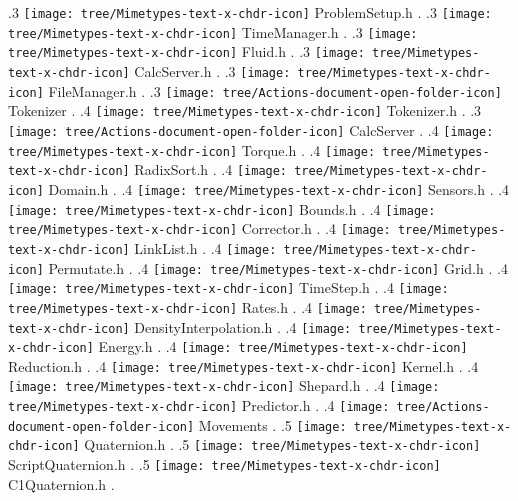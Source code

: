 {.3 { \texttt{[image: tree/Mimetypes-text-x-chdr-icon]} ProblemSetup.h }.
.3 { \texttt{[image: tree/Mimetypes-text-x-chdr-icon]} TimeManager.h }.
.3 { \texttt{[image: tree/Mimetypes-text-x-chdr-icon]} Fluid.h }.
.3 { \texttt{[image: tree/Mimetypes-text-x-chdr-icon]} CalcServer.h }.
.3 { \texttt{[image: tree/Mimetypes-text-x-chdr-icon]} FileManager.h }.
.3 { \texttt{[image: tree/Actions-document-open-folder-icon]} Tokenizer }.
.4 { \texttt{[image: tree/Mimetypes-text-x-chdr-icon]} Tokenizer.h }.
.3 { \texttt{[image: tree/Actions-document-open-folder-icon]} CalcServer }.
.4 { \texttt{[image: tree/Mimetypes-text-x-chdr-icon]} Torque.h }.
.4 { \texttt{[image: tree/Mimetypes-text-x-chdr-icon]} RadixSort.h }.
.4 { \texttt{[image: tree/Mimetypes-text-x-chdr-icon]} Domain.h }.
.4 { \texttt{[image: tree/Mimetypes-text-x-chdr-icon]} Sensors.h }.
.4 { \texttt{[image: tree/Mimetypes-text-x-chdr-icon]} Bounds.h }.
.4 { \texttt{[image: tree/Mimetypes-text-x-chdr-icon]} Corrector.h }.
.4 { \texttt{[image: tree/Mimetypes-text-x-chdr-icon]} LinkList.h }.
.4 { \texttt{[image: tree/Mimetypes-text-x-chdr-icon]} Permutate.h }.
.4 { \texttt{[image: tree/Mimetypes-text-x-chdr-icon]} Grid.h }.
.4 { \texttt{[image: tree/Mimetypes-text-x-chdr-icon]} TimeStep.h }.
.4 { \texttt{[image: tree/Mimetypes-text-x-chdr-icon]} Rates.h }.
.4 { \texttt{[image: tree/Mimetypes-text-x-chdr-icon]} DensityInterpolation.h }.
.4 { \texttt{[image: tree/Mimetypes-text-x-chdr-icon]} Energy.h }.
.4 { \texttt{[image: tree/Mimetypes-text-x-chdr-icon]} Reduction.h }.
.4 { \texttt{[image: tree/Mimetypes-text-x-chdr-icon]} Kernel.h }.
.4 { \texttt{[image: tree/Mimetypes-text-x-chdr-icon]} Shepard.h }.
.4 { \texttt{[image: tree/Mimetypes-text-x-chdr-icon]} Predictor.h }.
.4 { \texttt{[image: tree/Actions-document-open-folder-icon]} Movements }.
.5 { \texttt{[image: tree/Mimetypes-text-x-chdr-icon]} Quaternion.h }.
.5 { \texttt{[image: tree/Mimetypes-text-x-chdr-icon]} ScriptQuaternion.h }.
.5 { \texttt{[image: tree/Mimetypes-text-x-chdr-icon]} C1Quaternion.h }.
}
